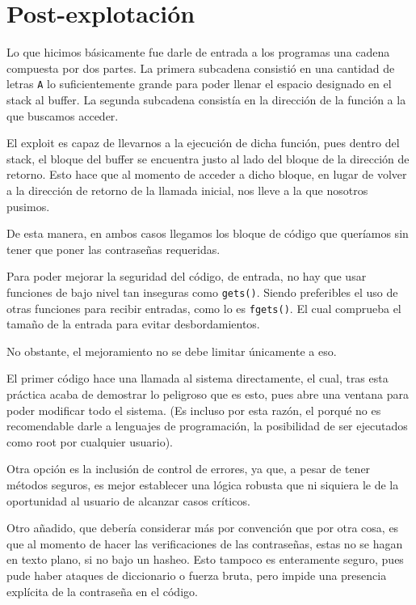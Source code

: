 \section{Post-explotación}

Lo que hicimos básicamente fue darle de entrada a los programas una cadena compuesta por dos partes. La primera subcadena consistió en una cantidad de letras \texttt{A} lo suficientemente grande para poder llenar el espacio designado en el stack al buffer. La segunda subcadena consistía en la dirección de la función a la que buscamos acceder.

El exploit es capaz de llevarnos a la ejecución de dicha función, pues dentro del stack, el bloque del buffer se encuentra justo al lado del bloque de la dirección de retorno. Esto hace que al momento de acceder a dicho bloque, en lugar de volver a la dirección de retorno de la llamada inicial, nos lleve a la que nosotros pusimos.

De esta manera, en ambos casos llegamos los bloque de código que queríamos sin tener que poner las contraseñas requeridas.

Para poder mejorar la seguridad del código, de entrada, no hay que usar funciones de bajo nivel tan inseguras como \texttt{gets()}. Siendo preferibles el uso de otras funciones para recibir entradas, como lo es \texttt{fgets()}. El cual comprueba el tamaño de la entrada para evitar desbordamientos.

No obstante, el mejoramiento no se debe limitar únicamente a eso. 

El primer código hace una llamada al sistema directamente, el cual, tras esta práctica acaba de demostrar lo peligroso que es esto, pues abre una ventana para poder modificar todo el sistema. (Es incluso por esta razón, el porqué no es recomendable darle a lenguajes de programación, la posibilidad de ser ejecutados como root por cualquier usuario).

Otra opción es la inclusión de control de errores, ya que, a pesar de tener métodos seguros, es mejor establecer una lógica robusta que ni siquiera le de la oportunidad al usuario de alcanzar casos críticos.

Otro añadido, que debería considerar más por convención que por otra cosa, es que al momento de hacer las verificaciones de las contraseñas, estas no se hagan en texto plano, si no bajo un hasheo. Esto tampoco es enteramente seguro, pues pude haber ataques de diccionario o fuerza bruta, pero impide una presencia explícita de la contraseña en el código.